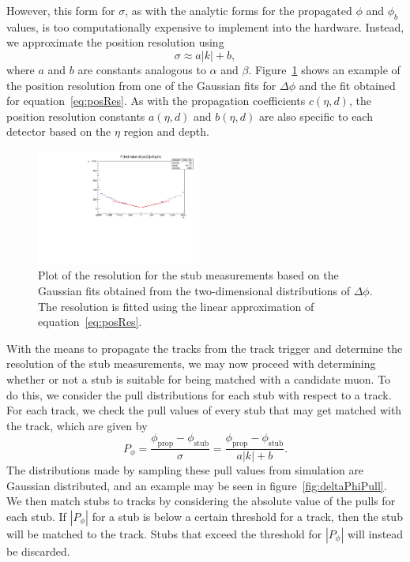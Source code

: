 However, this form for $\sigma$, as with the analytic forms for the propagated $\phi$ and $\phi_b$ values, is too computationally expensive to implement into the hardware.
Instead, we approximate the position resolution using
\begin{equation}\label{eq:posRes}
  \sigma\approx a|k|+b,
\end{equation}
where $a$ and $b$ are constants analogous to $\alpha$ and $\beta$.
Figure~\ref{fig:deltaPhiRes} shows an example of the position resolution from one of the Gaussian fits for $\Delta\phi$ and the fit obtained for equation~\ref{eq:posRes}.
As with the propagation coefficients $c(\eta,d)$, the position resolution constants $a(\eta,d)$ and $b(\eta,d)$ are also specific to each detector based on the $\eta$ region and depth.

\begin{figure}[htbp] %
  \centering
  \includegraphics[width=0.48\textwidth]{fig/TPS/deltaPhi_res.pdf}
  \caption{Plot of the resolution for the stub measurements based on the Gaussian fits obtained from the two-dimensional distributions of $\Delta\phi$. The resolution is fitted using the linear approximation of equation~\ref{eq:posRes}.}
  \label{fig:deltaPhiRes}
\end{figure}

With the means to propagate the tracks from the track trigger and determine the resolution of the stub measurements, we may now proceed with determining whether or not a stub is suitable for being matched with a candidate muon.
To do this, we consider the pull distributions for each stub with respect to a track.
For each track, we check the pull values of every stub that may get matched with the track, which are given by
\begin{equation}\label{eq:pull}
  P_\phi=\frac{\phi_\mathrm{prop}-\phi_\mathrm{stub}}{\sigma}=\frac{\phi_\mathrm{prop}-\phi_\mathrm{stub}}{a|k|+b}.
\end{equation}
The distributions made by sampling these pull values from simulation are Gaussian distributed, and an example may be seen in figure~\ref{fig:deltaPhiPull}.
We then match stubs to tracks by considering the absolute value of the pulls for each stub.
If $|P_\phi|$ for a stub is below a certain threshold for a track, then the stub will be matched to the track.
Stubs that exceed the threshold for $|P_\phi|$ will instead be discarded.


